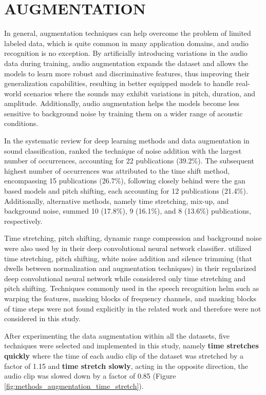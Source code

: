 \section{AUGMENTATION}
\label{sec:methods_augmentation}

In general, augmentation techniques can help overcome the problem of limited labeled data, which is quite common in many application domains, and audio recognition is no exception. By artificially introducing variations in the audio data during training, audio augmentation expands the dataset and allows the models to learn more robust and discriminative features, thus improving their generalization capabilities, resulting in better equipped models to handle real-world scenarios where the sounds may exhibit variations in pitch, duration, and amplitude. Additionally, audio augmentation helps the models become less sensitive to background noise by training them on a wider range of acoustic conditions.

In the systematic review for deep learning methods and data augmentation in sound classification, \textcite{Alli2022} ranked the technique of noise addition with the largest number of occurrences, accounting for 22 publications (39.2\%). The subsequent highest number of occurrences was attributed to the time shift method, encompassing 15 publications (26.7\%), following closely behind were the \gls{gan} based models and pitch shifting, each accounting for 12 publications (21.4\%). Additionally, alternative methods, namely time stretching, mix-up, and background noise, summed 10 (17.8\%), 9 (16.1\%), and 8 (13.6\%) publications, respectively. 

 Time stretching, pitch shifting, dynamic range compression and background noise were also used by \textcite{Salamon2017} in their deep convolutional neural network classifier. \textcite{Mmushtaq2020} utilized time stretching, pitch shifting, white noise addition and silence trimming (that dwells between normalization and augmentation techniques) in their regularized deep convolutional neural network while \textcite{Bountourakis2019} considered only time stretching and pitch shifting. Techniques commonly used in the speech recognition helm such as warping the features, masking blocks of frequency channels, and masking blocks of time steps \cite{Park2019} were not found explicitly in the related work and therefore were not considered in this study.

After experimenting the data augmentation within all the datasets, five techniques were selected and implemented in this study, namely \textbf{time stretches quickly} where the time of each audio clip of the dataset was stretched by a factor of 1.15 and \textbf{time stretch slowly}, acting in the opposite direction, the audio clip was slowed down by a factor of 0.85 (Figure \ref{fig:methods_augmentation_time_stretch}).

